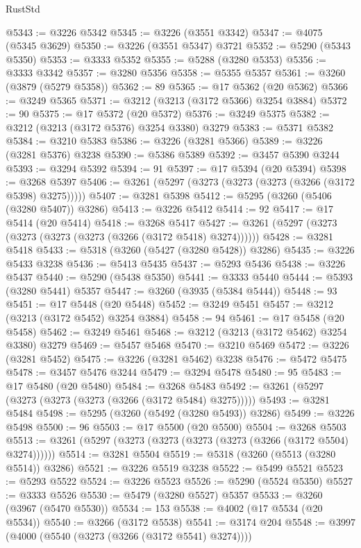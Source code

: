 \begin{lexlean}{RustStd}
\begin{coremodule}
{\begin{coremodule}
{{{{{{{{{{{{{{{{{{{{{{{{{{@5343 := @3226 @5342
@5345 := @3226 (@3551 @3342)
@5347 := @4075 (@5345 @3629)
@5350 := @3226 (@3551 @5347) @3721
@5352 := @5290 (@5343 @5350)
@5353 := @3333 @5352
@5355 := @5288 (@3280 @5353)
@5356 := @3333 @3342
@5357 := @3280 @5356
@5358 := @5355 @5357
@5361 := @3260 (@3879 (@5279 @5358))
@5362 := 89
@5365 := @17 @5362 (@20 @5362)
@5366 := @3249 @5365
@5371 := @3212 (@3213 (@3172 @5366) @3254 @3884)
@5372 := 90
@5375 := @17 @5372 (@20 @5372)
@5376 := @3249 @5375
@5382 := @3212 (@3213 (@3172 @5376) @3254 @3380) @3279
@5383 := @5371 @5382
@5384 := @3210 @5383
@5386 := @3226 (@3281 @5366)
@5389 := @3226 (@3281 @5376) @3238
@5390 := @5386 @5389
@5392 := @3457 @5390 @3244
@5393 := @3294 @5392
@5394 := 91
@5397 := @17 @5394 (@20 @5394)
@5398 := @3268 @5397
@5406 := @3261 (@5297 (@3273 (@3273 (@3273 (@3266 (@3172 @5398) @3275)))))
@5407 := @3281 @5398
@5412 := @5295 (@3260 (@5406 (@3280 @5407)) @3286)
@5413 := @3226 @5412
@5414 := 92
@5417 := @17 @5414 (@20 @5414)
@5418 := @3268 @5417
@5427 := @3261 (@5297 (@3273 (@3273 (@3273 (@3273 (@3266 (@3172 @5418) @3274))))))
@5428 := @3281 @5418
@5433 := @5318 (@3260 (@5427 (@3280 @5428)) @3286)
@5435 := @3226 @5433 @3238
@5436 := @5413 @5435
@5437 := @5293 @5436
@5438 := @3226 @5437
@5440 := @5290 (@5438 @5350)
@5441 := @3333 @5440
@5444 := @5393 (@3280 @5441) @5357
@5447 := @3260 (@3935 (@5384 @5444))
@5448 := 93
@5451 := @17 @5448 (@20 @5448)
@5452 := @3249 @5451
@5457 := @3212 (@3213 (@3172 @5452) @3254 @3884)
@5458 := 94
@5461 := @17 @5458 (@20 @5458)
@5462 := @3249 @5461
@5468 := @3212 (@3213 (@3172 @5462) @3254 @3380) @3279
@5469 := @5457 @5468
@5470 := @3210 @5469
@5472 := @3226 (@3281 @5452)
@5475 := @3226 (@3281 @5462) @3238
@5476 := @5472 @5475
@5478 := @3457 @5476 @3244
@5479 := @3294 @5478
@5480 := 95
@5483 := @17 @5480 (@20 @5480)
@5484 := @3268 @5483
@5492 := @3261 (@5297 (@3273 (@3273 (@3273 (@3266 (@3172 @5484) @3275)))))
@5493 := @3281 @5484
@5498 := @5295 (@3260 (@5492 (@3280 @5493)) @3286)
@5499 := @3226 @5498
@5500 := 96
@5503 := @17 @5500 (@20 @5500)
@5504 := @3268 @5503
@5513 := @3261 (@5297 (@3273 (@3273 (@3273 (@3273 (@3266 (@3172 @5504) @3274))))))
@5514 := @3281 @5504
@5519 := @5318 (@3260 (@5513 (@3280 @5514)) @3286)
@5521 := @3226 @5519 @3238
@5522 := @5499 @5521
@5523 := @5293 @5522
@5524 := @3226 @5523
@5526 := @5290 (@5524 @5350)
@5527 := @3333 @5526
@5530 := @5479 (@3280 @5527) @5357
@5533 := @3260 (@3967 (@5470 @5530))
@5534 := 153
@5538 := @4002 (@17 @5534 (@20 @5534))
@5540 := @3266 (@3172 @5538)
@5541 := @3174 @204
@5548 := @3997 (@4000 (@5540 (@3273 (@3266 (@3172 @5541) @3274))))
}}}}}}}}}}}}}}}}}}}}}}}}}}
\end{coremodule}}
\end{coremodule}
\end{lexlean}
